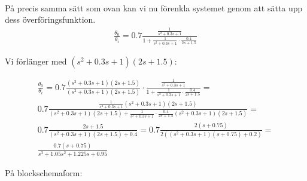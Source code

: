 \documentclass[a4paper]{article}
\begin{document}
\\


På precis samma sätt som ovan kan vi nu förenkla systemet genom att sätta upp dess överföringsfunktion.
\begin{align*}
  \frac{\theta_0}{\theta_i} = 0.7 \frac{\frac{1}{s^2 + 0.3s + 1}}{1+\frac{1}{s^2 + 0.3s + 1}\cdot \frac{0.4}{2s+1.5}}
\end{align*}


Vi förlänger med $(s^2 + 0.3s + 1)(2s+1.5)$:

\begin{align*}
  \frac{\theta_0}{\theta_i} = 0.7 \frac{(s^2 + 0.3s + 1)(2s+1.5)}{(s^2 + 0.3s + 1)(2s+1.5)} \cdot \frac{\frac{1}{s^2 + 0.3s + 1}}{1+\frac{1}{s^2 + 0.3s + 1}\cdot \frac{0.4}{2s+1.5}} = \\
  0.7 \frac{\frac{1}{s^2 + 0.3s + 1} (s^2 + 0.3s + 1)(2s+1.5)}{(s^2 + 0.3s + 1)(2s+1.5) + \frac{1}{s^2 + 0.3s + 1}\cdot \frac{0.4}{2s+1.5} (s^2 + 0.3s + 1)(2s+1.5)} = \\
  0.7 \frac{2s+1.5}{(s^2 + 0.3s + 1)(2s+1.5) + 0.4} = 0.7 \frac{2(s+0.75)}{2((s^2 + 0.3s + 1)(s+0.75) + 0.2)} = \\
  \frac{0.7(s+0.75)}{s^3 + 1.05s^2 + 1.225s + 0.95}
\end{align*}


På blockschemaform:\\
\end{document}
